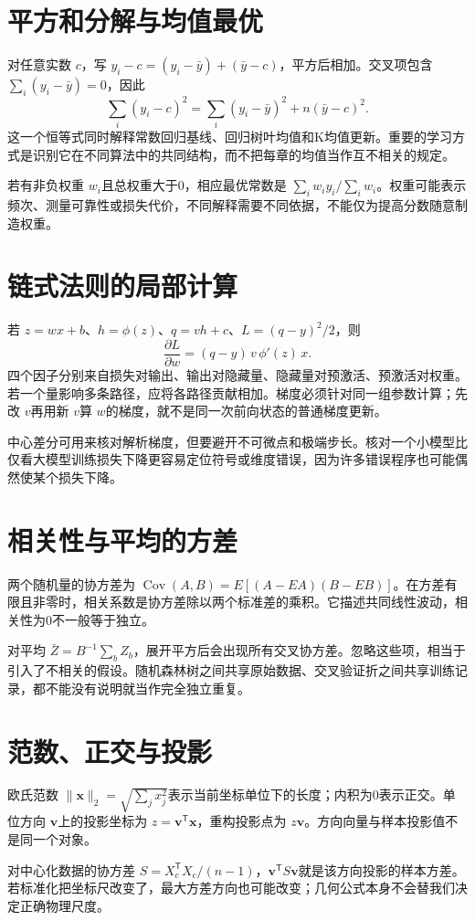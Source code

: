 
\section{平方和分解与均值最优}
对任意实数 $c$，写 $y_i-c=(y_i-\bar y)+(\bar y-c)$，平方后相加。交叉项包含 $\sum_i(y_i-\bar y)=0$，因此
\[
\sum_i(y_i-c)^2=\sum_i(y_i-\bar y)^2+n(\bar y-c)^2.
\]
这一个恒等式同时解释常数回归基线、回归树叶均值和K均值更新。重要的学习方式是识别它在不同算法中的共同结构，而不把每章的均值当作互不相关的规定。

若有非负权重 $w_i$且总权重大于0，相应最优常数是 $\sum_iw_iy_i/\sum_iw_i$。权重可能表示频次、测量可靠性或损失代价，不同解释需要不同依据，不能仅为提高分数随意制造权重。

\section{链式法则的局部计算}
若 $z=wx+b$、$h=\phi(z)$、$q=vh+c$、$L=(q-y)^2/2$，则
\[
\frac{\partial L}{\partial w}=(q-y)\,v\,\phi'(z)\,x.
\]
四个因子分别来自损失对输出、输出对隐藏量、隐藏量对预激活、预激活对权重。若一个量影响多条路径，应将各路径贡献相加。梯度必须针对同一组参数计算；先改 $v$再用新 $v$算 $w$的梯度，就不是同一次前向状态的普通梯度更新。

中心差分可用来核对解析梯度，但要避开不可微点和极端步长。核对一个小模型比仅看大模型训练损失下降更容易定位符号或维度错误，因为许多错误程序也可能偶然使某个损失下降。

\section{相关性与平均的方差}
两个随机量的协方差为 $\operatorname{Cov}(A,B)=E[(A-EA)(B-EB)]$。在方差有限且非零时，相关系数是协方差除以两个标准差的乘积。它描述共同线性波动，相关性为0不一般等于独立。

对平均 $\bar Z=B^{-1}\sum_bZ_b$，展开平方后会出现所有交叉协方差。忽略这些项，相当于引入了不相关的假设。随机森林树之间共享原始数据、交叉验证折之间共享训练记录，都不能没有说明就当作完全独立重复。

\section{范数、正交与投影}
欧氏范数 $\|\mathbf x\|_2=\sqrt{\sum_jx_j^2}$表示当前坐标单位下的长度；内积为0表示正交。单位方向 $\mathbf v$上的投影坐标为 $z=\mathbf v^\mathsf T\mathbf x$，重构投影点为 $z\mathbf v$。方向向量与样本投影值不是同一个对象。

对中心化数据的协方差 $S=X_c^\mathsf TX_c/(n-1)$，$\mathbf v^\mathsf TS\mathbf v$就是该方向投影的样本方差。若标准化把坐标尺改变了，最大方差方向也可能改变；几何公式本身不会替我们决定正确物理尺度。
